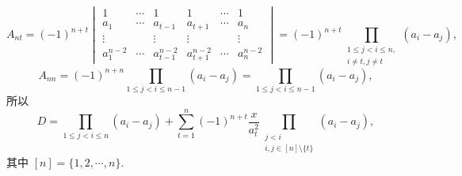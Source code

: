 \documentclass[../../main.tex]{subfiles}
\begin{document}
\begin{solution}
\[\]
\[
A_{nt} = (-1)^{n + t} \begin{vmatrix} 1 & \cdots & 1 & 1 & \cdots & 1 \\ a_1 & \cdots & a_{t - 1} & a_{t + 1} & \cdots & a_n \\ \vdots & & \vdots & \vdots & & \vdots \\ a_1^{n - 2} & \cdots & a_{t - 1}^{n - 2} & a_{t + 1}^{n - 2} & \cdots & a_n^{n - 2} \end{vmatrix} = (-1)^{n + t} \prod_{\substack{1 \leqslant j < i \leqslant n, \\ i \neq t, j \neq t}} (a_i - a_j),
\]
\[
A_{nn}=(-1)^{n+n}\prod_{1\leqslant j<i\leqslant n-1}{\left( a_i-a_j \right)}=\prod_{1\leqslant j<i\leqslant n-1}{\left( a_i-a_j \right)},
\]
所以
\[
D = \prod_{1 \leqslant j < i \leqslant n} (a_i - a_j) + \sum_{t = 1}^n (-1)^{n + t} \dfrac{x}{a_t^2} \prod_{\substack{j < i \\ i, j \in [n] \setminus \{t\}}} (a_i - a_j),
\]
其中 \([n] = \{1, 2, \cdots, n\}\).
\end{solution}
\end{document}
